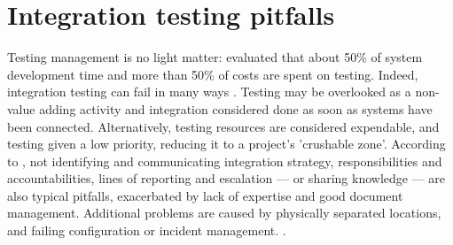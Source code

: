 \documentclass[12pt,a4paper,oneside,pdftex]{report}
\begin{document}
\section{Integration testing pitfalls}
\label{section:pitfalls}

Testing management is no light matter: \citet{reid2005art} evaluated that about 50\% of system development time and more than 50\% of costs are spent on testing. Indeed, integration testing can fail in many ways \citep{van2008identifying}. Testing may be overlooked as a non-value adding activity and integration considered done as soon as systems have been connected. Alternatively, testing resources are considered expendable, and testing given a low priority, reducing it to a project's 'crushable zone'. According to \citet{van2008identifying}, not identifying and communicating integration strategy, responsibilities and accountabilities, lines of reporting and escalation --- or sharing knowledge --- are also typical pitfalls, exacerbated by lack of expertise and good document management. Additional problems are caused by physically separated locations, and failing configuration or incident management. \citep{van2008identifying}.
\end{document}

